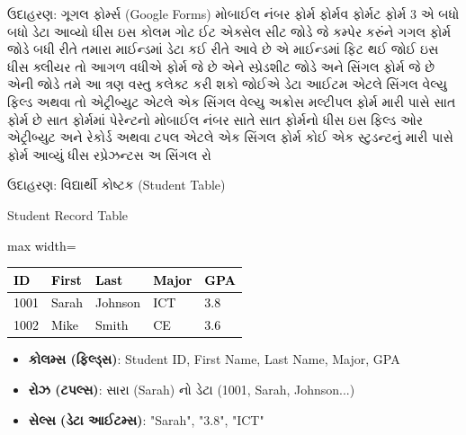 \documentclass[aspectratio=169, 10pt]{beamer}
\begin{document}
\begin{frame}{ઉદાહરણ: ગૂગલ ફોર્મ્સ (Google Forms)}
{મોબાઈલ નંબર ફોર્મ ફોર્મવ ફોર્મટ ફોર્મ 3 એ બધો બધો ડેટા આવ્યો ધીસ ઇસ કોલમ ગોટ ઈટ એક્સેલ સીટ જોડે જે કમ્પેર કરુંને ગગલ ફોર્મ જોડે બધી રીતે તમારા માઈન્ડમાં ડેટા કઈ રીતે આવે છે એ માઈન્ડમાં ફિટ થઈ જોઈ ઇસ ધીસ ક્લીયર તો આગળ વધીએ ફોર્મ જે છે એને સ્પ્રેડશીટ જોડે અને સિંગલ ફોર્મ જે છે એની જોડે તમે આ ત્રણ વસ્તુ કલેક્ટ કરી શકો જોઈએ ડેટા આઈટમ એટલે સિંગલ વેલ્યુ ફિલ્ડ અથવા તો એટ્રીબ્યુટ એટલે એક સિંગલ વેલ્યુ અક્રોસ મલ્ટીપલ ફોર્મ મારી પાસે સાત ફોર્મ છે સાત ફોર્મમાં પેરેન્ટનો મોબાઈલ નંબર સાતે સાત ફોર્મનો ધીસ ઇસ ફિલ્ડ ઓર એટ્રીબ્યુટ અને રેકોર્ડ અથવા ટપલ એટલે એક સિંગલ ફોર્મ કોઈ એક સ્ટુડન્ટનું મારી પાસે ફોર્મ આવ્યું ધીસ રપ્રેઝન્ટસ અ સિંગલ રો
}
\end{frame}

\begin{frame}{ઉદાહરણ: વિદ્યાર્થી કોષ્ટક (Student Table)}
    \begin{exampleblock}{Student Record Table}
        \begin{center}
            \textcolor{black}{
            \begin{adjustbox}{max width=\textwidth}
            \begin{tabular}{|l|l|l|l|l|}
            \hline
            \textbf{ID} & \textbf{First} & \textbf{Last} & \textbf{Major} & \textbf{GPA} \\ \hline
            1001 & Sarah & Johnson & ICT & 3.8 \\ \hline
            1002 & Mike & Smith & CE & 3.6 \\ \hline
            \end{tabular}
            \end{adjustbox}
            }
        \end{center}
        \begin{itemize}
            \item \textbf{કોલમ્સ (ફિલ્ડ્સ)}: Student ID, First Name, Last Name, Major, GPA
            \item \textbf{રોઝ (ટપલ્સ)}: સારા (Sarah) નો ડેટા (1001, Sarah, Johnson...)
            \item \textbf{સેલ્સ (ડેટા આઈટમ્સ)}: "Sarah", "3.8", "ICT"
        \end{itemize}
    \end{exampleblock}
\note{
}
\end{frame}
\end{document}

